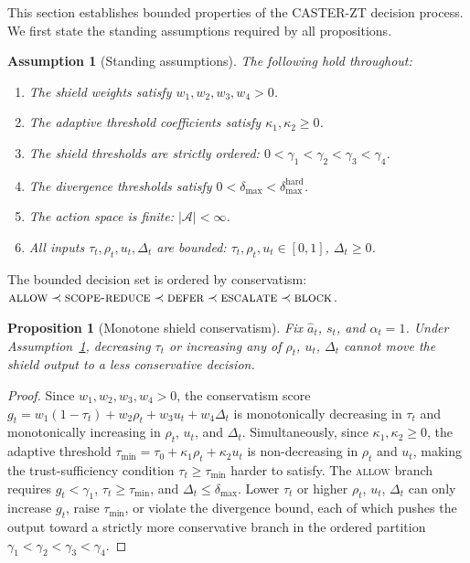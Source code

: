 \documentclass[10pt,journal,compsoc]{IEEEtran}
\newtheorem{proposition}{Proposition}
\newtheorem{assumption}{Assumption}
\begin{document}
This section establishes bounded properties of the CASTER-ZT decision process.
We first state the standing assumptions required by all propositions.

\begin{assumption}[Standing assumptions]
\label{asm:standing}
The following hold throughout:
\begin{enumerate}
    \item The shield weights satisfy $w_1, w_2, w_3, w_4 > 0$.
    \item The adaptive threshold coefficients satisfy $\kappa_1, \kappa_2 \ge 0$.
    \item The shield thresholds are strictly ordered: $0 < \gamma_1 < \gamma_2 < \gamma_3 < \gamma_4$.
    \item The divergence thresholds satisfy $0 < \delta_{\max} < \delta_{\max}^{\mathrm{hard}}$.
    \item The action space is finite: $|\mathcal{A}| < \infty$.
    \item All inputs $\tau_t, \rho_t, u_t, \Delta_t$ are bounded: $\tau_t, \rho_t, u_t \in [0,1]$, $\Delta_t \ge 0$.
\end{enumerate}
\end{assumption}

\noindent The bounded decision set is ordered by conservatism:
$\textsc{allow} \prec \textsc{scope-reduce} \prec \textsc{defer} \prec \textsc{escalate} \prec \textsc{block}$.

\begin{proposition}[Monotone shield conservatism]
\label{prop:monotone}
Fix $\hat a_t$, $s_t$, and $\alpha_t=1$.
Under Assumption~\ref{asm:standing}, decreasing $\tau_t$ or increasing any of $\rho_t$, $u_t$, $\Delta_t$ cannot move the shield output to a less conservative decision.
\end{proposition}
\begin{proof}
Since $w_1, w_2, w_3, w_4 > 0$, the conservatism score $g_t = w_1(1-\tau_t)+w_2\rho_t+w_3 u_t+w_4\Delta_t$ is monotonically decreasing in $\tau_t$ and monotonically increasing in $\rho_t$, $u_t$, and $\Delta_t$.
Simultaneously, since $\kappa_1, \kappa_2 \ge 0$, the adaptive threshold $\tau_{\min} = \tau_0 + \kappa_1\rho_t + \kappa_2 u_t$ is non-decreasing in $\rho_t$ and $u_t$, making the trust-sufficiency condition $\tau_t \ge \tau_{\min}$ harder to satisfy.
The \textsc{allow} branch requires $g_t < \gamma_1$, $\tau_t \ge \tau_{\min}$, and $\Delta_t \le \delta_{\max}$.
Lower $\tau_t$ or higher $\rho_t$, $u_t$, $\Delta_t$ can only increase $g_t$, raise $\tau_{\min}$, or violate the divergence bound, each of which pushes the output toward a strictly more conservative branch in the ordered partition $\gamma_1 < \gamma_2 < \gamma_3 < \gamma_4$.
\end{proof}
\end{document}

